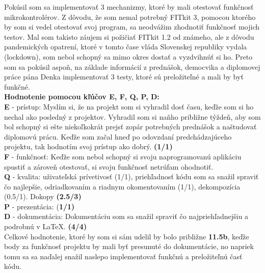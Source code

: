 \documentclass[11pt,a4paper]{article}
\begin{document}
    \indent Pokúsil som sa implementovať 3 mechanizmy, ktoré by mali otestovať funkčnosť mikrokontrolérov. Z dôvodu, že som nemal potrebný FITkit 3, pomocou ktorého by som si vedel otestovať svoj program, sa neodvážim zhodnotiť funkčnosť mojich testov. Mal som takisto záujem si požičiať FITkit 1.2 od známeho, ale z dôvodu pandemických opatrení, ktoré v tomto čase vláda Slovenskej republiky vydala (lockdown), som nebol schopný sa mimo okres dostať a vyzdvihnúť si ho. Preto som sa pokúsil aspoň, na základe informácií z prednášok, democvika a diplomovej práce pána Denka implementovať 3 testy, ktoré sú preložiteľné a mali by byť funkčné.  \\[1em]
    \textbf{Hodnotenie pomocou kľúčov E, F, Q, P, D:}\\
    \textbf{E} - prístup: Myslím si, že na projekt som si vyhradil dosť času, keďže som si ho nechal ako posledný z projektov. Vyhradil som si naňho približne týždeň, aby som bol schopný si ešte niekoľkokrát prejsť zopár potrebných prednášok a naštudovať diplomovú prácu. Keďže som začal hneď po odovzdaní predchádzajúceho projektu, tak hodnotím svoj prístup ako dobrý. \textbf{(1/1)}\\
    \textbf{F} - funkčnosť: Keďže som nebol schopný si svoju naprogramovanú aplikáciu spustiť a zároveň otestovať, si svoju funkčnosť netrúfam ohodnotiť.\\
    \textbf{Q} - kvalita: uživateľská prívetivosť (1/1), priehľadnosť kódu som sa snažil spraviť čo najlepšie, odriadkovaním a riadnym okomentovaním (1/1), dekompozícia (0.5/1). Dokopy \textbf{(2.5/3)}\\
    \textbf{P} - prezentácia: (\textbf{1/1)}\\
    \textbf{D} - dokumentácia: Dokumentáciu som sa snažil spraviť čo najpriehľadnejšiu a podrobnú v \LaTeX. \textbf{(4/4)}\\[1em]
    Celkové hodnotenie, ktoré by som si sám udelil by bolo približne \textbf{11.5b}, keďže body za funkčnosť projektu by mali byť presunuté do dokumentácie, no napriek tomu sa sa naďalej snažil naslepo implementovať funkčnú a preložiteľnú časť kódu.
    
\newpage %
\printbibliography
\end{document}
